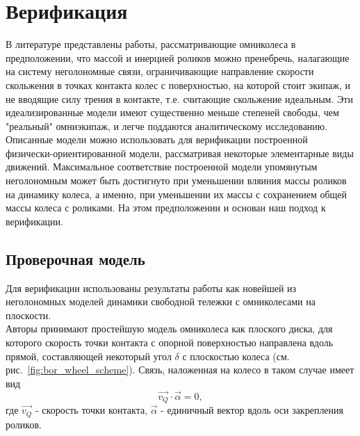 \section{Верификация}
В литературе представлены \cite{borisov, formalskii, ZobovaTatarinovPMM} работы, рассматривающие омниколеса в предположении, что массой и инерцией роликов можно пренебречь, налагающие на систему неголономные связи, ограничивающие направление скорости скольжения в точках контакта колес с поверхностью, на которой стоит экипаж, и не вводящие силу трения в контакте, т.е. считающие скольжение идеальным. Эти идеализированные модели имеют существенно меньше степеней свободы, чем "реальный" омниэкипаж, и легче поддаются аналитическому исследованию.\\

Описанные модели можно использовать для верификации построенной физически-ориентированной модели, рассматривая некоторые элементарные виды движений. Максимальное соответствие построенной модели упомянутым неголономным может быть достигнуто при уменьшении вляиния массы роликов на динамику колеса, а именно, при уменьшении их массы с сохранением общей массы колеса с роликами. На этом предположении и основан наш подход к верификации.\\

\subsection{Проверочная модель}

Для верификации использованы результаты работы \cite{borisov} как новейшей из неголономных моделей динамики свободной тележки с омниколесами на плоскости.\\

Авторы \cite{borisov} принимают простейшую модель омниколеса как плоского диска, для которого скорость точки контакта с опорной поверхностью направлена вдоль прямой, составляющей некоторый угол $\delta$ с плоскостью колеса (см. рис.~\ref{fig:bor_wheel_scheme}). Связь, наложенная на колесо в таком случае имеет вид
$$\vec{v_Q}\cdot\vec{\alpha} = 0,$$
где $\vec{v_Q}$ - скорость точки контакта, $\vec{\alpha}$ - единичный вектор вдоль оси закрепления роликов.\\

